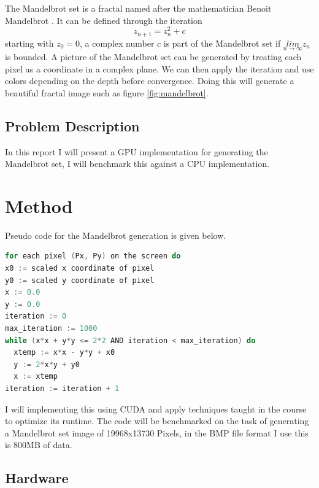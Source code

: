 \documentclass{article}
\begin{document}
The Mandelbrot set is a fractal named after the mathematician Benoit Mandelbrot
\cite{mandelbrot}.
It can be defined through the iteration \cite{mandelbrot} $$ z_{n + 1} = z_n^2 + c $$ starting with $z_0 = 0$, a
complex number $c$ is part of the Mandelbrot set if $\underset{n \rightarrow \infty}{lim} z_n$
is bounded. A picture of the Mandelbrot set can be generated by treating each pixel as a
coordinate in a complex plane. We can then apply the iteration and use colors depending
on the depth before convergence. Doing this will generate a beautiful fractal image such as
figure \ref{fig:mandelbrot}.

\subsection{Problem Description}%
\label{sub:problem_description}

In this report I will present a GPU implementation for generating the Mandelbrot set, I will
benchmark this against a CPU implementation. 


\section{Method}%
\label{sec:method}



Pseudo code for the Mandelbrot generation
\cite{mandelbrot} is
given below.

\begin{mdframed}[backgroundcolor=codeColor,leftmargin=0.0cm,hidealllines=true,%
  innerleftmargin=0.1cm,innerrightmargin=0.1cm,innertopmargin=0.5cm,innerbottommargin=0.10cm,
  roundcorner=15pt]
\begin{lstlisting}[language=c]
for each pixel (Px, Py) on the screen do
x0 := scaled x coordinate of pixel
y0 := scaled y coordinate of pixel 
x := 0.0
y := 0.0
iteration := 0
max_iteration := 1000
while (x*x + y*y <= 2*2 AND iteration < max_iteration) do
  xtemp := x*x - y*y + x0
  y := 2*x*y + y0
  x := xtemp
iteration := iteration + 1
\end{lstlisting}
\end{mdframed}

I will implementing this using CUDA and apply techniques taught in the course to optimize
its runtime. The code will be benchmarked on the task of generating a Mandelbrot set image of
19968x13730 Pixels, in the BMP file format I use this is 800MB of data. 

\subsection{Hardware}%
\label{sub:hardware}
\end{document}
